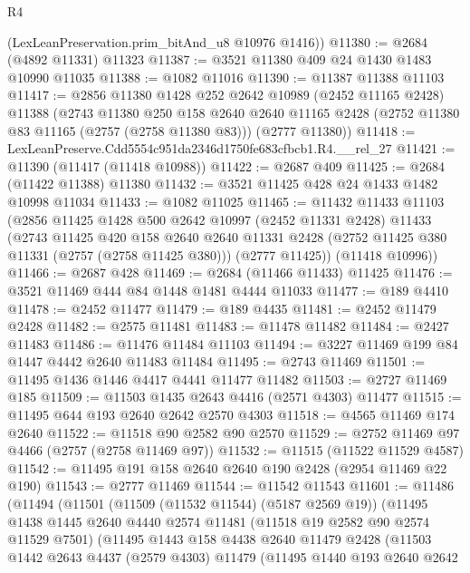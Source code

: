 \begin{lexlean}{R4}
\begin{coremodule}
      (LexLeanPreservation.prim_bitAnd_u8 @10976 @1416))
@11380 := @2684 (@4892 @11331) @11323
@11387 := @3521 @11380 @409 @24 @1430 @1483 @10990 @11035
@11388 := @1082 @11016
@11390 := @11387 @11388 @11103
@11417 := @2856
    @11380
    @1428
    @252
    @2642
    @10989
    (@2452 @11165 @2428)
    @11388
    (@2743
      @11380
      @250
      @158
      @2640
      @2640
      @11165
      @2428
      (@2752 @11380 @83 @11165 (@2757 (@2758 @11380 @83)))
      (@2777 @11380))
@11418 := LexLeanPreserve.Cdd5554c951da2346d1750fe683cfbcb1.R4.__rel_27
@11421 := @11390 (@11417 (@11418 @10988))
@11422 := @2687 @409
@11425 := @2684 (@11422 @11388) @11380
@11432 := @3521 @11425 @428 @24 @1433 @1482 @10998 @11034
@11433 := @1082 @11025
@11465 := @11432
    @11433
    @11103
    (@2856
      @11425
      @1428
      @500
      @2642
      @10997
      (@2452 @11331 @2428)
      @11433
      (@2743
        @11425
        @420
        @158
        @2640
        @2640
        @11331
        @2428
        (@2752 @11425 @380 @11331 (@2757 (@2758 @11425 @380)))
        (@2777 @11425))
      (@11418 @10996))
@11466 := @2687 @428
@11469 := @2684 (@11466 @11433) @11425
@11476 := @3521 @11469 @444 @84 @1448 @1481 @4444 @11033
@11477 := @189 @4410
@11478 := @2452 @11477
@11479 := @189 @4435
@11481 := @2452 @11479 @2428
@11482 := @2575 @11481
@11483 := @11478 @11482
@11484 := @2427 @11483
@11486 := @11476 @11484 @11103
@11494 := @3227 @11469 @199 @84 @1447 @4442 @2640 @11483 @11484
@11495 := @2743 @11469
@11501 := @11495 @1436 @1446 @4417 @4441 @11477 @11482
@11503 := @2727 @11469 @185
@11509 := @11503 @1435 @2643 @4416 (@2571 @4303) @11477
@11515 := @11495 @644 @193 @2640 @2642 @2570 @4303
@11518 := @4565 @11469 @174 @2640
@11522 := @11518 @90 @2582 @90 @2570
@11529 := @2752 @11469 @97 @4466 (@2757 (@2758 @11469 @97))
@11532 := @11515 (@11522 @11529 @4587)
@11542 := @11495 @191 @158 @2640 @2640 @190 @2428 (@2954 @11469 @22 @190)
@11543 := @2777 @11469
@11544 := @11542 @11543
@11601 := @11486
    (@11494
      (@11501
        (@11509 (@11532 @11544) (@5187 @2569 @19))
        (@11495
          @1438
          @1445
          @2640
          @4440
          @2574
          @11481
          (@11518 @19 @2582 @90 @2574 @11529 @7501)
          (@11495
            @1443
            @158
            @4438
            @2640
            @11479
            @2428
            (@11503
              @1442
              @2643
              @4437
              (@2579 @4303)
              @11479
              (@11495
                @1440
                @193
                @2640
                @2642

\end{coremodule}
\end{lexlean}
